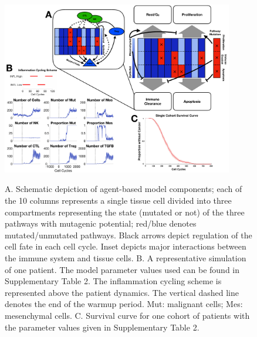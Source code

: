 \documentclass[11pt]{article}
\newcommand{\tcr} { \textcolor{red} }
\begin{document}
\begin{figure}
\center
{\includegraphics[width=0.9\textwidth]{Figure1/Figure1.pdf}}
\caption{A. Schematic depiction of agent-based model components;
each of the 10 columns represents a single tissue cell divided into three compartments representing the state (mutated or not) of the three pathways with mutagenic potential;
red/blue denotes mutated/unmutated pathways. Black arrows depict regulation of the cell fate in each cell cycle. Inset depicts major interactions between the immune system and tissue cells.
B. A representative simulation of one patient. The model parameter values used can be found in Supplementary Table 2. 
The inflammation cycling scheme is represented above the patient dynamics. The vertical dashed line denotes the end of the warmup period. Mut: malignant cells; Mes: mesenchymal cells. 
C. Survival curve for one cohort of patients with the parameter values given in Supplementary Table 2. }
\label{fig:ModelIntro}
\end{figure}
\end{document}
